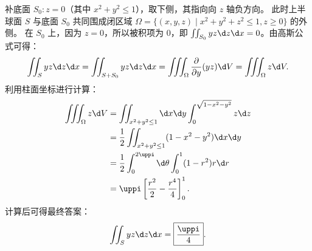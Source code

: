 \begin{solution}
    补底面 $S_0: z = 0$（其中 $x^2 + y^2 \le 1$），取下侧，其指向向 $z$ 轴负方向。
    此时上半球面 $S$ 与底面 $S_0$ 共同围成闭区域 $\Omega = \{ (x, y, z) \mid x^2 + y^2 + z^2 \le 1, z \ge 0 \}$ 的外侧。
    在 $S_0$ 上，因为 $z = 0$，所以被积项为 $0$，即 $\iint_{S_0} y z \d z \d x = 0$。由高斯公式可得：
    \begin{equation}
        \label{eq:hemisphere-top-1}
        \iint_{S} y z \d z \d x = \iint_{S + S_0} y z \d z \d x = \iiint_{\Omega} \frac{\partial}{\partial y} (y z) \d V = \iiint_{\Omega} z \d V.
    \end{equation}
    利用柱面坐标进行计算：
    \begin{equation}
        \label{eq:hemisphere-top-2}
        \begin{aligned}
            \iiint_{\Omega} z \d V & = \iint_{x^2 + y^2 \le 1} \d x \d y \int_0^{\sqrt{1 - x^2 - y^2}} z \d z \\
                                   & = \frac{1}{2} \iint_{x^2 + y^2 \le 1} (1 - x^2 - y^2) \d x \d y          \\
                                   & = \frac{1}{2} \int_0^{2\uppi} \d \theta \int_0^1 (1 - r^2) r \d r        \\
                                   & = \uppi \left[ \frac{r^2}{2} - \frac{r^4}{4} \right]_0^1.
        \end{aligned}
    \end{equation}
    计算后可得最终答案：
    \begin{equation}
        \label{eq:hemisphere-top-3}
        \iint_{S} y z \d z \d x = \boxed{\frac{\uppi}{4}}.
    \end{equation}



\end{solution}
